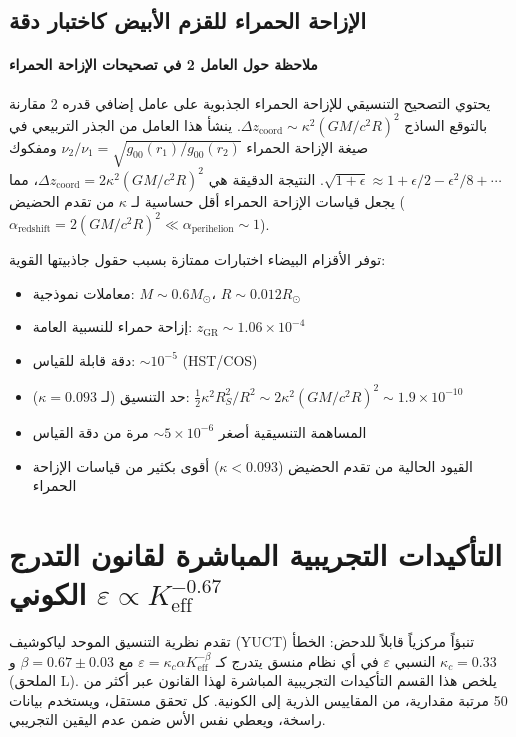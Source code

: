 \documentclass[11pt,a4paper]{article}
\begin{document}
	\subsection{الإزاحة الحمراء للقزم الأبيض كاختبار دقة}
	\paragraph{ملاحظة حول العامل 2 في تصحيحات الإزاحة الحمراء}
	يحتوي التصحيح التنسيقي للإزاحة الحمراء الجذبوية على عامل إضافي قدره 2 مقارنة بالتوقع الساذج $\Delta z_{\text{coord}} \sim \kappa^2 (GM/c^2R)^2$. ينشأ هذا العامل من الجذر التربيعي في صيغة الإزاحة الحمراء $\nu_2/\nu_1 = \sqrt{g_{00}(r_1)/g_{00}(r_2)}$ ومفكوك $\sqrt{1 + \epsilon} \approx 1 + \epsilon/2 - \epsilon^2/8 + \cdots$. النتيجة الدقيقة هي $\Delta z_{\text{coord}} = 2\kappa^2 (GM/c^2R)^2$، مما يجعل قياسات الإزاحة الحمراء أقل حساسية لـ $\kappa$ من تقدم الحضيض ($\alpha_{\text{redshift}} = 2(GM/c^2R)^2 \ll \alpha_{\text{perihelion}} \sim 1$).
	
	توفر الأقزام البيضاء اختبارات ممتازة بسبب حقول جاذبيتها القوية:
	\begin{itemize}
		\item معاملات نموذجية: $M \sim 0.6 M_\odot$، $R \sim 0.012 R_\odot$
		\item إزاحة حمراء للنسبية العامة: $z_{\text{GR}} \sim 1.06\times10^{-4}$
		\item دقة قابلة للقياس: $\sim 10^{-5}$ (HST/COS)
		\item حد التنسيق (لـ $\kappa = 0.093$): $\frac{1}{2}\kappa^2 R_S^2/R^2 \sim 2\kappa^2 (GM/c^2R)^2 \sim 1.9\times10^{-10}$
		\item المساهمة التنسيقية أصغر $\sim 5\times10^{-6}$ مرة من دقة القياس
		\item القيود الحالية من تقدم الحضيض ($\kappa < 0.093$) أقوى بكثير من قياسات الإزاحة الحمراء
	\end{itemize}
	
	\section{التأكيدات التجريبية المباشرة لقانون التدرج الكوني $\varepsilon \propto K_{\mathrm{eff}}^{-0.67}$}
	\label{sec:experimental-verifications}
	
	تقدم نظرية التنسيق الموحد لياكوشيف (YUCT) تنبؤاً مركزياً قابلاً للدحض: الخطأ النسبي $\varepsilon$ في أي نظام منسق يتدرج كـ $\varepsilon = \kappa_c \alpha K_{\mathrm{eff}}^{-\beta}$ مع $\beta = 0.67 \pm 0.03$ و $\kappa_c = 0.33$ (الملحق L). يلخص هذا القسم التأكيدات التجريبية المباشرة لهذا القانون عبر أكثر من 50 مرتبة مقدارية، من المقاييس الذرية إلى الكونية. كل تحقق مستقل، ويستخدم بيانات راسخة، ويعطي نفس الأس ضمن عدم اليقين التجريبي.
	
\end{document}
